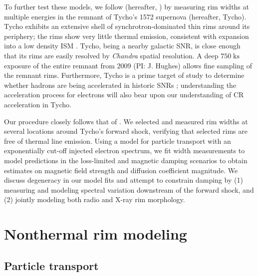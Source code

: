 \documentclass[iop, apj, numberedappendix]{emulateapj}
\newcommand*{\mt}{\mathrm}
\newcommand*{\unit}[1]{\;\mt{#1}}  %
\begin{document}
To further test these models, we follow \citet{ressler2014} (hereafter,
) by measuring rim widths at multiple energies in the
remnant of Tycho's 1572 supernova (hereafter, Tycho).  Tycho exhibits an
extensive shell of synchrotron-dominated thin rims around its periphery; the
rims show very little thermal emission, consistent with expansion into a low
density ISM \citep{williams2013}.  Tycho, being a nearby galactic SNR, is close
enough that its rims are easily resolved by \textit{Chandra} spatial
resolution. A deep $750 \unit{ks}$ exposure of the entire remnant from 2009
(PI: J. Hughes) allows fine sampling of the remnant rims.  Furthermore, Tycho
is a prime target of study to determine whether hadrons are being accelerated
in historic SNRs \citep[and references therein]{morlino2012}; understanding the
acceleration process for electrons will also bear upon our understanding of CR
acceleration in Tycho.

Our procedure closely follows that of .
We selected and measured rim widths at several locations around Tycho's forward
shock, verifying that selected rims are free of thermal line emission.  Using a
model for particle transport with an exponentially cut-off injected electron
spectrum, we fit width measurements to model predictions in the loss-limited
and magnetic damping scenarios to obtain estimates on magnetic field strength
and diffusion coefficient magnitude.  We discuss degeneracy in our model fits
and attempt to constrain damping by (1) measuring and modeling spectral variation
downstream of the forward shock, and (2) jointly modeling both radio and X-ray
rim morphology.

\section{Nonthermal rim modeling}\label{sec:models}

\subsection{Particle transport}\label{sec:transport}
\end{document}
